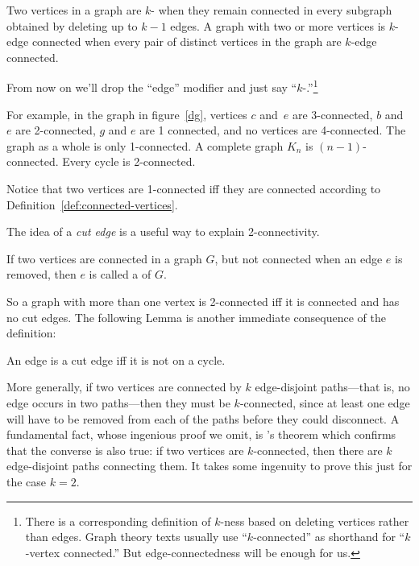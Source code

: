 \begin{definition}\label{def:k-connected}
Two vertices in a graph are $k$- when they remain
connected in every subgraph obtained by deleting up to $k-1$ edges.  A
graph with two or more vertices is $k$-edge
connected when every
pair of distinct vertices in the graph are $k$-edge connected.
\end{definition}
\iffalse
every two of its vertices are $k$-edge connected.
\fi

From now on we'll drop the ``edge'' modifier and just say
``$k$-.''\footnote{There is a corresponding definition
  of $k$-ness based on
  deleting vertices rather than edges.  Graph theory texts usually use
  ``$k$-connected'' as shorthand for ``$k$-vertex connected.''  But
  edge-connectedness will be enough for us.}

For example, in the graph in figure~\ref{dg}, vertices $c$ and~$e$ are
3-connected, $b$ and~$e$ are 2-connected, $g$ and $e$ are 1 connected,
and no vertices are 4-connected.  The graph as a whole is only
1-connected.  A complete graph $K_n$ is $(n-1)$-connected.  Every
cycle is 2-connected.

Notice that two vertices are 1-connected iff they are connected
according to Definition~\ref{def:connected-vertices}.

The idea of a \emph{cut edge} is a useful way to explain 2-connectivity.
\begin{definition}
If two vertices are connected in a graph $G$, but not connected when
an edge $e$ is removed, then $e$ is called a  of $G$.
\end{definition}
So a graph with more than one vertex is 2-connected iff it is
connected and has no cut edges.  The following Lemma is
another immediate consequence of the definition:
\begin{lemma}\label{lem:cutiffcycle}
An edge is a cut edge iff it is not on a cycle.
\end{lemma}
More generally, if two vertices are connected by $k$ edge-disjoint
paths---that is, no edge occurs in two paths---then they must
be $k$-connected, since at least one edge will have to be removed from
each of the paths before they could disconnect.  A fundamental fact,
whose ingenious proof we omit, is 's theorem which
confirms that the converse is also true: if two vertices are
$k$-connected, then there are $k$ edge-disjoint paths connecting them.
It takes some ingenuity to prove this just for the case $k=2$.

